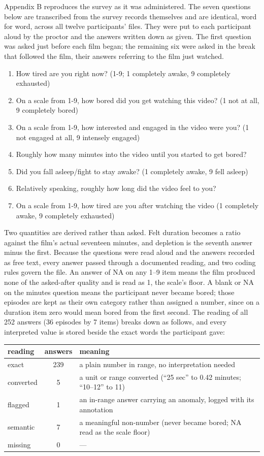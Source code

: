 Appendix B reproduces the survey as it was administered. The seven questions below are
transcribed from the survey records themselves and are identical, word for word, across all
twelve participants' files. They were put to each participant aloud by the proctor and the
answers written down as given. The first question was asked just before each film began; the
remaining six were asked in the break that followed the film, their answers referring to the
film just watched.

\begin{enumerate}
\item How tired are you right now? (1-9; 1 completely awake, 9 completely exhausted)
\item On a scale from 1-9, how bored did you get watching this video? (1 not at all, 9
completely bored)
\item On a scale from 1-9, how interested and engaged in the video were you? (1 not engaged
at all, 9 intensely engaged)
\item Roughly how many minutes into the video until you started to get bored?
\item Did you fall asleep/fight to stay awake? (1 completely awake, 9 fell asleep)
\item Relatively speaking, roughly how long did the video feel to you?
\item On a scale from 1-9, how tired are you after watching the video (1 completely awake, 9
completely exhausted)
\end{enumerate}

Two quantities are derived rather than asked. Felt duration becomes a ratio against the
film's actual seventeen minutes, and depletion is the seventh answer minus the first. Because
the questions were read aloud and the answers recorded as free text, every answer passed
through a documented reading, and two coding rules govern the file. An answer of NA on any
1--9 item means the film produced none of the asked-after quality and is read as 1, the
scale's floor. A blank or NA on the minutes question means the participant never became
bored; those episodes are kept as their own category rather than assigned a number, since on
a duration item zero would mean bored from the first second. The reading of all 252 answers
(36 episodes by 7 items) breaks down as follows, and every interpreted value is stored
beside the exact words the participant gave:

\begin{tabular}{lcl}
\hline
reading & answers & meaning \\
\hline
exact & 239 & a plain number in range, no interpretation needed \\
converted & 5 & a unit or range converted (``25 sec'' to 0.42 minutes; ``10--12'' to 11) \\
flagged & 1 & an in-range answer carrying an anomaly, logged with its annotation \\
semantic & 7 & a meaningful non-number (never became bored; NA read as the scale floor) \\
missing & 0 & --- \\
\hline
\end{tabular}

